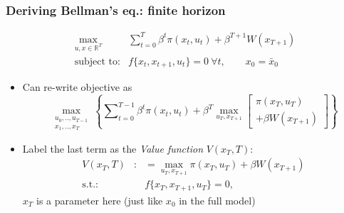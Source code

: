 \documentclass[bigger,handout]{beamer}
\newenvironment{stepitemize}{\begin{itemize}[<+->]}{\end{itemize} }
\begin{document}
\begin{frame}%

\frametitle{Deriving Bellman's eq.: finite horizon }

\begin{equation*}
\begin{array}{rc}
\max_{u,x\in \mathbb{R}^{T}} & \sum_{t=0}^{T}\beta ^{t}\pi
(x_{t},u_{t})+\beta ^{T+1}W(x_{T+1}) \\
\text{subject to:} & f\{x_{t},x_{t+1},u_{t}\}=0\ \forall t,\qquad x_{0}=\bar{x}_{0}%
\end{array}%
\end{equation*}

\begin{stepitemize}
\item Can re-write objective as%
\begin{equation*}
\max_{\substack{ u_{0},..,u_{T-1}  \\ x_{1},..,x_{T}}}\left\{
\sum\nolimits_{t=0}^{T-1}\beta ^{t}\pi (x_{t},u_{t})+\beta
^{T}\max_{u_{T},x_{T+1}}\left[
\begin{array}{c}
\pi (x_{T},u_{T}) \\
+\beta W(x_{T+1})%
\end{array}%
\right] \right\}
\end{equation*}

\item Label the last term as the \emph{Value function} $V(x_{T},T)$:%
\begin{eqnarray*}
V(x_{T},T) &:&=\max_{u_{T},x_{T+1}}\pi (x_{T},u_{T})+\beta W(x_{T+1}) \\
\text{s.t.}\text{: } &&f\{x_{T},x_{T+1},u_{T}\}=0\text{, }
\end{eqnarray*}%
$x_{T}$ is a parameter here (just like $x_{0}$ in the full model)
\end{stepitemize}



\end{frame}%
\end{document}
